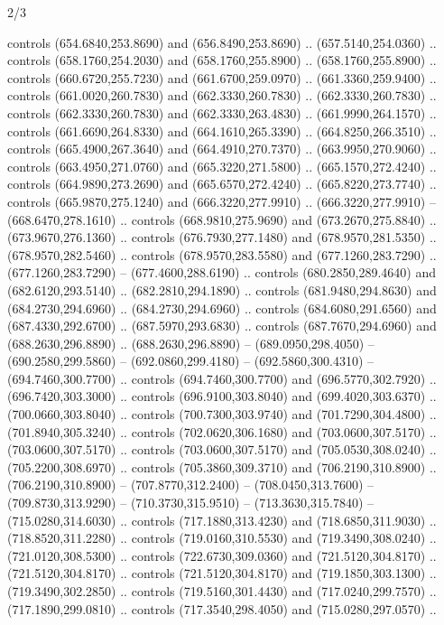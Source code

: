\begin{flagdescription}{2/3}
\begin{scope}[xshift=0.5\flaglength,yshift=0.5\flagwidth,scale=\flagwidth/638.38]
\begin{scope}[y=0.80pt, x=0.80pt, yscale=-1,shift={(-600,-400)}]
\begin{scope}[shift={(-0.02,2.173)}]
  controls (654.6840,253.8690) and (656.8490,253.8690) .. (657.5140,254.0360) ..
  controls (658.1760,254.2030) and (658.1760,255.8900) .. (658.1760,255.8900) ..
  controls (660.6720,255.7230) and (661.6700,259.0970) .. (661.3360,259.9400) ..
  controls (661.0020,260.7830) and (662.3330,260.7830) .. (662.3330,260.7830) ..
  controls (662.3330,260.7830) and (662.3330,263.4830) .. (661.9990,264.1570) ..
  controls (661.6690,264.8330) and (664.1610,265.3390) .. (664.8250,266.3510) ..
  controls (665.4900,267.3640) and (664.4910,270.7370) .. (663.9950,270.9060) ..
  controls (663.4950,271.0760) and (665.3220,271.5800) .. (665.1570,272.4240) ..
  controls (664.9890,273.2690) and (665.6570,272.4240) .. (665.8220,273.7740) ..
  controls (665.9870,275.1240) and (666.3220,277.9910) .. (666.3220,277.9910) --
  (668.6470,278.1610) .. controls (668.9810,275.9690) and (673.2670,275.8840) ..
  (673.9670,276.1360) .. controls (676.7930,277.1480) and (678.9570,281.5350) ..
  (678.9570,282.5460) .. controls (678.9570,283.5580) and (677.1260,283.7290) ..
  (677.1260,283.7290) -- (677.4600,288.6190) .. controls (680.2850,289.4640) and
  (682.6120,293.5140) .. (682.2810,294.1890) .. controls (681.9480,294.8630) and
  (684.2730,294.6960) .. (684.2730,294.6960) .. controls (684.6080,291.6560) and
  (687.4330,292.6700) .. (687.5970,293.6830) .. controls (687.7670,294.6960) and
  (688.2630,296.8890) .. (688.2630,296.8890) -- (689.0950,298.4050) --
  (690.2580,299.5860) -- (692.0860,299.4180) -- (692.5860,300.4310) --
  (694.7460,300.7700) .. controls (694.7460,300.7700) and (696.5770,302.7920) ..
  (696.7420,303.3000) .. controls (696.9100,303.8040) and (699.4020,303.6370) ..
  (700.0660,303.8040) .. controls (700.7300,303.9740) and (701.7290,304.4800) ..
  (701.8940,305.3240) .. controls (702.0620,306.1680) and (703.0600,307.5170) ..
  (703.0600,307.5170) .. controls (703.0600,307.5170) and (705.0530,308.0240) ..
  (705.2200,308.6970) .. controls (705.3860,309.3710) and (706.2190,310.8900) ..
  (706.2190,310.8900) -- (707.8770,312.2400) -- (708.0450,313.7600) --
  (709.8730,313.9290) -- (710.3730,315.9510) -- (713.3630,315.7840) --
  (715.0280,314.6030) .. controls (717.1880,313.4230) and (718.6850,311.9030) ..
  (718.8520,311.2280) .. controls (719.0160,310.5530) and (719.3490,308.0240) ..
  (721.0120,308.5300) .. controls (722.6730,309.0360) and (721.5120,304.8170) ..
  (721.5120,304.8170) .. controls (721.5120,304.8170) and (719.1850,303.1300) ..
  (719.3490,302.2850) .. controls (719.5160,301.4430) and (717.0240,299.7570) ..
  (717.1890,299.0810) .. controls (717.3540,298.4050) and (715.0280,297.0570) ..

\end{scope}
\end{scope}
\end{scope}
\end{flagdescription}
